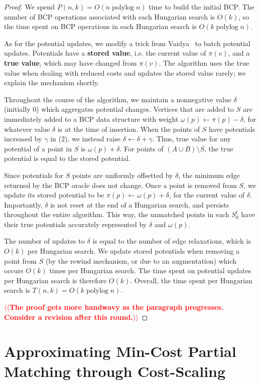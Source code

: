 \documentclass[11pt]{article}
\makeatletter
\def\polylog{\mathop{\mathrm{polylog}}}
\theoremstyle{plain}
\numberwithin{figure}{section}
\def\EMPH#1{\textbf{\boldmath #1}}
\def\n@te#1{\textsf{\boldmath \textbf{$\langle\!\langle$#1$\rangle\!\rangle$}}\leavevmode}
\def\note#1{\textcolor{red}{\n@te{#1}}}
\makeatother
\begin{document}
\begin{proof}
We spend $P(n, k) = O(n \polylog n)$ time to build the initial BCP.
The number of BCP operations associated with each Hungarian search is
$O(k)$, so the time spent on BCP operations in each Hungarian search
is $O(k \polylog n)$.

As for the potential updates, we modify a trick from Vaidya~\cite{Vaidya89} to
batch potential updates.
Potentials have a \EMPH{stored value}, i.e. the current value of $\pi(v)$,
and a \EMPH{true value}, which may have changed from $\pi(v)$.
The algorithm uses the true value when dealing with reduced costs and updates
the stored value rarely; we explain the mechanism shortly.

Throughout the course of the algorithm, we maintain a nonnegative value
$\delta$ (initially 0) which aggregates potential changes.
Vertices that are added to $S$ are immediately added to a BCP data structure
with weight $\omega(p) \gets \pi(p) - \delta$, for whatever value $\delta$ is
at the time of insertion.
When the points of $S$ have potentials increased by $\gamma$ in (2), we instead
raise $\delta \gets \delta + \gamma$.
Thus, true value for any potential of a point in $S$ is $\omega(p) + \delta$.
For points of $(A \cup B) \setminus S$, the true potential is equal to the
stored potential.

Since potentials for $S$ points are uniformly offsetted by $\delta$, the
minimum edge returned by the BCP oracle does not change.
Once a point is removed from $S$, we update its stored potential
to be $\pi(p) \gets \omega(p) + \delta$, for the current value of $\delta$.
Importantly, $\delta$ is not reset at the end of a Hungarian search, and
persists throughout the entire algorithm.
This way, the unmatched points in each $S^t_0$ have their true potentials
accurately represented by $\delta$ and $\omega(p)$.

The number of updates to $\delta$ is equal to the number of edge relaxations,
which is $O(k)$ per Hungarian search.
We update stored potentials when removing a point from $S$ (by the rewind
mechanism, or due to an augmentation) which occurs $O(k)$ times per Hungarian
search.
The time spent on potential updates per Hungarian search is therefore $O(k)$.
Overall, the time spent per Hungarian search is $T(n, k) = O(k\polylog n)$.

\note{The proof gets more handwavy as the paragraph progresses.  Consider a revision after this round.}
\end{proof}


\section{Approximating Min-Cost Partial Matching through Cost-Scaling}
\end{document}
